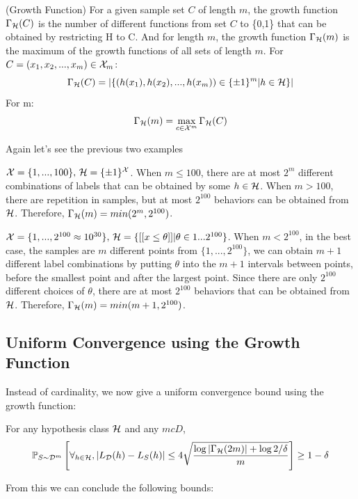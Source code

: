 \documentclass{article}
\begin{document}
\begin{defn}(Growth Function) For a given sample set $C$ of length $m$, the growth function $\Gamma_{\mathcal{H}}(C)$ is the number of different functions from set $C$ to \{0,1\} that can be obtained by restricting H to C. And for length $m$, the growth function $\Gamma_{\mathcal{H}}(m)$ is the maximum of the growth functions of all sets of length $m$.
For $C=(x_1, x_2,...,x_m)\in \mathcal{X}_m$:
\begin{displaymath}
	\Gamma_{\mathcal{H}}(C)=|\{(h(x_1),h(x_2),...,h(x_m))\in \{\pm 1\}^m|h\in \mathcal{H}\}|
\end{displaymath}
For m:
\begin{displaymath}
	\Gamma_{\mathcal{H}}(m)=\max_{c\in \mathcal{X}^m}\Gamma_{\mathcal{H}}(C)
\end{displaymath}
\end{defn}

 Again let's see the previous two examples
\begin{example}
$\mathcal{X}=\{1,...,100\},\,\mathcal{H}=\{\pm1\}^{\mathcal{X}}$. When $m\leq 100$, there are at most $2^m$ different combinations of labels that can be obtained by some $h\in \mathcal{H}$. When $m > 100$, there are repetition in samples, but at most $2^{100}$ behaviors can be obtained from $\mathcal{H}$. Therefore, $\Gamma_{\mathcal{H}}(m)=min(2^m, 2^{100})$.
\end{example}
\begin{example}
$\mathcal{X}=\{1,...,2^{100}\approx 10^{30}\},\,\mathcal{H}=\{[[x\leq \theta]]|\theta\in 1...2^{100}\}$. When $m < 2^{100}$, in the best case, the samples are $m$ different points from $\{1,...,2^{100}\}$, we can obtain $m+1$ different label combinations by putting $\theta$ into the $m+1$ intervals between points, before the smallest point and after the largest point. Since there are only $2^{100}$ different choices of $\theta$, there are at most $2^{100}$ behaviors that can be obtained from $\mathcal{H}$. Therefore, $\Gamma_{\mathcal{H}}(m)=min(m+1, 2^{100})$.
\end{example}
\subsection{Uniform Convergence using the Growth Function}
Instead of cardinality, we now give a uniform convergence bound using the growth function:

\begin{theorem}\label{t1}
	For any hypothesis class $\mathcal{H}$ and any $mcD$, 
\begin{displaymath}
	\mathbb{P}_{S\sim\mathcal{D}^m}\left[\forall_{h\in\mathcal{H}}, |L_{\mathcal{D}}(h)-L_S(h)|\leq 4\sqrt{\frac{\log{|\Gamma_{\mathcal{H}}(2m)|}+\log{2/\delta}}{m}}\right] \geq 1-\delta
\end{displaymath}
\end{theorem}
From this we can conclude the following bounds:
\end{document}
